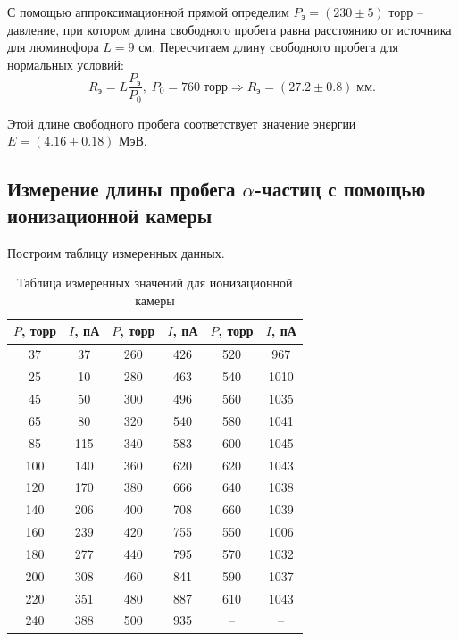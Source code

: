     С помощью аппроксимационной прямой определим $P_{\text{э}} = (230 \pm 5)$ торр -- давление, при котором длина свободного пробега равна расстоянию от источника для люминофора $L = 9$ см. Пересчитаем длину свободного пробега для нормальных условий:
    \begin{equation}
        R_{\text{э}} = L \frac{P_{\text{э}}}{P_0}, \; P_0 = 760 \; \text{торр} \Rightarrow R_{\text{э}} = (27.2 \pm 0.8) \; \text{мм}.
    \end{equation}

    Этой длине свободного пробега соответствует значение энергии $E = (4.16 \pm 0.18)$ МэВ.

\subsection{Измерение длины пробега $\alpha$-частиц с помощью ионизационной камеры}

    Построим таблицу измеренных данных.

    \begin{table}[h!]
        \centering
        \begin{tabular}{|c|c|c|c|c|c|}
        \hline
        $P$, торр & $I$, пА & $P$, торр & $I$, пА & $P$, торр & $I$, пА \\ \hline
        37        & 37      & 260       & 426     & 520       & 967     \\ \hline
        25        & 10      & 280       & 463     & 540       & 1010    \\ \hline
        45        & 50      & 300       & 496     & 560       & 1035    \\ \hline
        65        & 80      & 320       & 540     & 580       & 1041    \\ \hline
        85        & 115     & 340       & 583     & 600       & 1045    \\ \hline
        100       & 140     & 360       & 620     & 620       & 1043    \\ \hline
        120       & 170     & 380       & 666     & 640       & 1038    \\ \hline
        140       & 206     & 400       & 708     & 660       & 1039    \\ \hline
        160       & 239     & 420       & 755     & 550       & 1006    \\ \hline
        180       & 277     & 440       & 795     & 570       & 1032    \\ \hline
        200       & 308     & 460       & 841     & 590       & 1037    \\ \hline
        220       & 351     & 480       & 887     & 610       & 1043    \\ \hline
        240       & 388     & 500       & 935     & --        & --      \\ \hline
        \end{tabular}
        \caption{Таблица измеренных значений для ионизационной камеры}
    \end{table}


